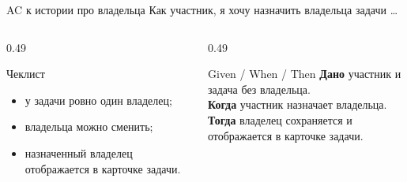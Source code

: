 \begin{frame}{AC к истории про владельца}
  \vspace{0.15em}
  {\small Как участник, я хочу назначить владельца задачи \ldots}

  \vspace{0.45em}
  \begin{columns}[T]
    \begin{column}{0.49\textwidth}
      \begin{block}{Чеклист}
        \begin{itemize}\setlength\itemsep{0.22em}
          \item у задачи ровно один владелец;
          \item владельца можно сменить;
          \item назначенный владелец отображается в карточке задачи.
        \end{itemize}
      \end{block}
    \end{column}
    \begin{column}{0.49\textwidth}
      \begin{block}{Given / When / Then}
        {\small
        \textbf{Дано} участник и задача без владельца.\\
        \textbf{Когда} участник назначает владельца.\\
        \textbf{Тогда} владелец сохраняется
        и отображается в карточке задачи.}
      \end{block}
    \end{column}
  \end{columns}
\end{frame}
